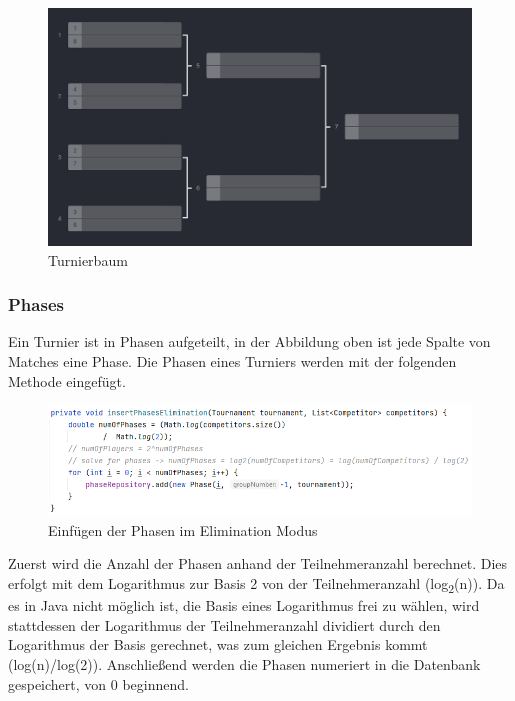 \begin{figure}[H]
    \includegraphics[scale=0.5]{pics/elimination_tree.png}
    \caption{Turnierbaum\cite{implementation-elimination-1}}
\end{figure}

\subsubsection{Phases}

Ein Turnier ist in Phasen aufgeteilt, in der Abbildung oben ist jede Spalte von Matches eine Phase. Die Phasen eines Turniers werden mit der folgenden Methode eingefügt.

\begin{figure}[H]
    \includegraphics[scale=0.7]{pics/elimination_insertPhases.png}
    \caption{Einfügen der Phasen im Elimination Modus}
\end{figure}

Zuerst wird die Anzahl der Phasen anhand der Teilnehmeranzahl berechnet. Dies erfolgt mit dem Logarithmus zur Basis 2 von der Teilnehmeranzahl (log\textsubscript{2}(n)). 
Da es in Java nicht möglich ist, die Basis eines Logarithmus frei zu wählen, wird stattdessen der Logarithmus der Teilnehmeranzahl dividiert durch den 
Logarithmus der Basis gerechnet, was zum gleichen Ergebnis kommt (log(n)/log(2)). Anschließend werden die Phasen numeriert in die Datenbank gespeichert, von 0 beginnend.

